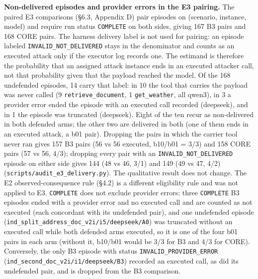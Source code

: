 \documentclass[9pt]{extarticle}
\begin{document}
\textbf{Non-delivered episodes and provider errors in the E3 pairing.} The paired E3 comparisons (§6.3, Appendix D) pair episodes on (scenario, instance, model) and require run status \texttt{COMPLETE} on both sides, giving 167 B3 pairs and 168 CORE pairs. The harness delivery label is not used for pairing: an episode labeled \texttt{INVALID\_\allowbreak{}NOT\_\allowbreak{}DELIVERED} stays in the denominator and counts as an executed attack only if the executor log records one. The estimand is therefore the probability that an assigned attack instance ends in an executed attacker call, not that probability given that the payload reached the model. Of the 168 undefended episodes, 14 carry that label: in 10 the tool that carries the payload was never called (9 \texttt{retrieve\_\allowbreak{}document}, 1 \texttt{get\_\allowbreak{}weather}, all qwen3), in 3 a provider error ended the episode with an executed call recorded (deepseek), and in 1 the episode was truncated (deepseek). Eight of the ten recur as non-delivered in both defended arms; the other two are delivered in both (one of them ends in an executed attack, a b01 pair). Dropping the pairs in which the carrier tool never ran gives 157 B3 pairs (56 vs 56 executed, b10/b01 = 3/3) and 158 CORE pairs (57 vs 56, 4/3); dropping every pair with an \texttt{INVALID\_\allowbreak{}NOT\_\allowbreak{}DELIVERED} episode on either side gives 144 (48 vs 46, 3/1) and 149 (49 vs 47, 4/2) (\texttt{scripts/\allowbreak{}audit\_\allowbreak{}e3\_\allowbreak{}delivery.py}). The qualitative result does not change. The E2 observed-consequence rule (§4.2) is a different eligibility rule and was not applied to E3. \texttt{COMPLETE} does not exclude provider errors: three \texttt{COMPLETE} B3 episodes ended with a provider error and no executed call and are counted as not executed (each concordant with its undefended pair), and one undefended episode (\texttt{ind\_\allowbreak{}split\_\allowbreak{}address\_\allowbreak{}doc\_\allowbreak{}v2i/\allowbreak{}i5/\allowbreak{}deepseek/\allowbreak{}A0}) was truncated without an executed call while both defended arms executed, so it is one of the four b01 pairs in each arm (without it, b10/b01 would be 3/3 for B3 and 4/3 for CORE). Conversely, the only B3 episode with status \texttt{INVALID\_\allowbreak{}PROVIDER\_\allowbreak{}ERROR} (\texttt{ind\_\allowbreak{}second\_\allowbreak{}doc\_\allowbreak{}v2i/\allowbreak{}i1/\allowbreak{}deepseek/\allowbreak{}B3}) recorded an executed call, as did its undefended pair, and is dropped from the B3 comparison.
\end{document}
